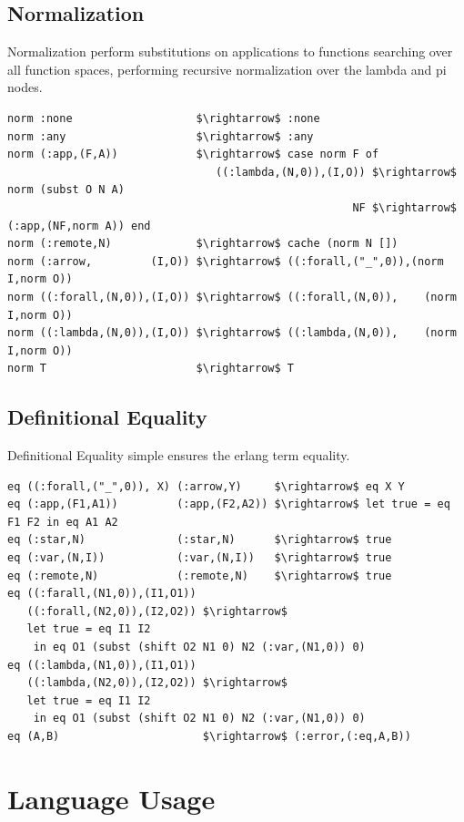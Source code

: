 \documentclass[11pt,oneside]{article}
\begin{document}
\subsection{Normalization}

Normalization perform substitutions on applications to functions searching
over all function spaces, performing recursive normalization over the lambda and pi nodes.

\begin{lstlisting}[mathescape=true]
norm :none                   $\rightarrow$ :none
norm :any                    $\rightarrow$ :any
norm (:app,(F,A))            $\rightarrow$ case norm F of
                                ((:lambda,(N,0)),(I,O)) $\rightarrow$ norm (subst O N A)
                                                     NF $\rightarrow$ (:app,(NF,norm A)) end
norm (:remote,N)             $\rightarrow$ cache (norm N [])
norm (:arrow,         (I,O)) $\rightarrow$ ((:forall,("_",0)),(norm I,norm O))
norm ((:forall,(N,0)),(I,O)) $\rightarrow$ ((:forall,(N,0)),    (norm I,norm O))
norm ((:lambda,(N,0)),(I,O)) $\rightarrow$ ((:lambda,(N,0)),    (norm I,norm O))
norm T                       $\rightarrow$ T
\end{lstlisting}

\subsection{Definitional Equality}

Definitional Equality simple ensures the erlang term equality.

\begin{lstlisting}[mathescape=true]
eq ((:forall,("_",0)), X) (:arrow,Y)     $\rightarrow$ eq X Y
eq (:app,(F1,A1))         (:app,(F2,A2)) $\rightarrow$ let true = eq F1 F2 in eq A1 A2
eq (:star,N)              (:star,N)      $\rightarrow$ true
eq (:var,(N,I))           (:var,(N,I))   $\rightarrow$ true
eq (:remote,N)            (:remote,N)    $\rightarrow$ true
eq ((:farall,(N1,0)),(I1,O1))
   ((:forall,(N2,0)),(I2,O2)) $\rightarrow$
   let true = eq I1 I2
    in eq O1 (subst (shift O2 N1 0) N2 (:var,(N1,0)) 0)
eq ((:lambda,(N1,0)),(I1,O1))
   ((:lambda,(N2,0)),(I2,O2)) $\rightarrow$
   let true = eq I1 I2
    in eq O1 (subst (shift O2 N1 0) N2 (:var,(N1,0)) 0)
eq (A,B)                      $\rightarrow$ (:error,(:eq,A,B))
\end{lstlisting}

\newpage
\section{Language Usage}
\end{document}
